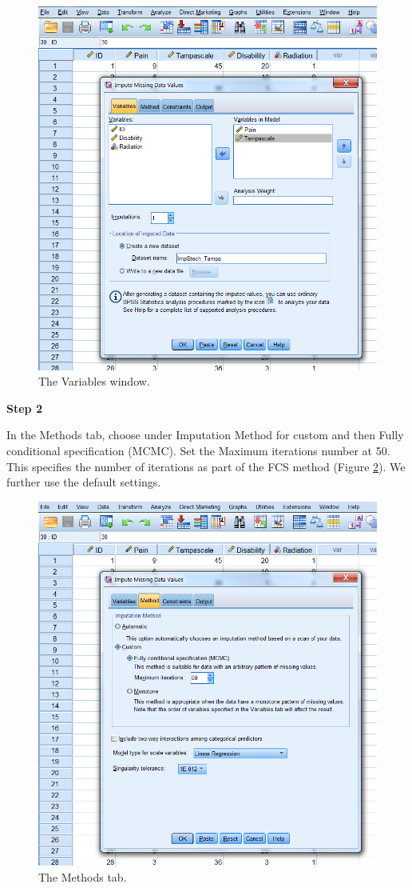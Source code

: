 \documentclass[
]{book}
\begin{document}
\begin{figure}

{\centering \includegraphics[width=0.7\linewidth]{images/fig3.18} 

}

\caption{The Variables window.}\label{fig:fig3-18}
\end{figure}

\textbf{Step 2}

In the Methods tab, choose under Imputation Method for custom and then Fully conditional specification (MCMC). Set the Maximum iterations number at 50. This specifies the number of iterations as part of the FCS method (Figure \ref{fig:fig3-19}). We further use the default settings.

\begin{figure}

{\centering \includegraphics[width=0.7\linewidth]{images/fig3.19} 

}

\caption{The Methods tab.}\label{fig:fig3-19}
\end{figure}
\end{document}
